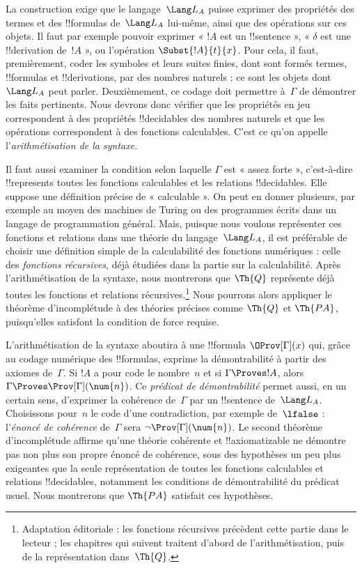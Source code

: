 \documentclass[../../../include/open-logic-section]{subfiles}
\begin{document}
La construction exige que le langage~$\Lang L_A$ puisse exprimer
des propriétés des termes et des !!{formula}s de~$\Lang L_A$
lui-même, ainsi que des opérations sur ces objets. Il faut par
exemple pouvoir exprimer « $!A$ est un !!{sentence} »,
« $\delta$ est une !!{derivation} de~$!A$ », ou l'opération
$\Subst{!A}{t}{x}$. Pour cela, il faut, premièrement, coder les
symboles et leurs suites finies, dont sont formés termes,
!!{formula}s et !!{derivation}s, par des nombres naturels : ce sont
les objets dont $\Lang L_A$ peut parler. Deuxièmement, ce codage
doit permettre à~$\Gamma$ de démontrer les faits pertinents. Nous
devrons donc vérifier que les propriétés en jeu correspondent à des
propriétés !!{decidable}s des nombres naturels et que les opérations
correspondent à des fonctions calculables. C'est ce qu'on appelle
l'\emph{arithmétisation de la syntaxe}.

Il faut aussi examiner la condition selon
laquelle $\Gamma$ est « assez forte », c'est-à-dire !!{represents}
toutes les fonctions calculables et les relations !!{decidable}s.
Elle suppose une définition précise de « calculable ». On peut en
donner plusieurs, par exemple au moyen des machines de Turing ou des
programmes écrits dans un langage de programmation général. Mais,
puisque nous voulons représenter ces fonctions et relations dans
une théorie du langage~$\Lang L_A$, il est préférable de choisir
une définition simple de la calculabilité des fonctions numériques :
celle des \emph{fonctions récursives}, déjà étudiées dans la partie sur la calculabilité.
Après l'arithmétisation de la syntaxe, nous montrerons que $\Th{Q}$ représente déjà toutes les
fonctions et relations récursives.\footnote{Adaptation éditoriale : les fonctions récursives précèdent cette partie dans le lecteur ; les chapitres qui suivent traitent d'abord de l'arithmétisation, puis de la représentation dans~$\Th{Q}$.} Nous pourrons alors appliquer le
théorème d'incomplétude à des théories précises comme $\Th{Q}$ et
$\Th{PA}$, puisqu'elles satisfont la condition de force requise.

L'arithmétisation de la syntaxe aboutira à une !!{formula}
$\OProv[\Gamma](x)$ qui, grâce au codage numérique des !!{formula}s,
exprime la démontrabilité à partir des axiomes de~$\Gamma$. Si
$!A$ a pour code le nombre~$n$ et si $\Gamma\Proves !A$, alors
$\Gamma\Proves\Prov[\Gamma](\num{n})$. Ce \emph{prédicat de
démontrabilité} permet aussi, en un certain sens, d'exprimer la
cohérence de~$\Gamma$ par un !!{sentence} de~$\Lang L_A$.
Choisissons pour~$n$ le code d'une contradiction, par exemple
de~$\lfalse$ : l'\emph{énoncé de cohérence} de~$\Gamma$ sera
$\lnot\Prov[\Gamma](\num{n})$. Le second théorème d'incomplétude
affirme qu'une théorie cohérente et !!{axiomatizable} ne démontre pas
non plus son propre énoncé de cohérence, sous des hypothèses un peu
plus exigeantes que la seule représentation de toutes les fonctions
calculables et relations !!{decidable}s, notamment les conditions de démontrabilité du prédicat usuel. Nous montrerons que
$\Th{PA}$ satisfait ces hypothèses.
\end{document}
